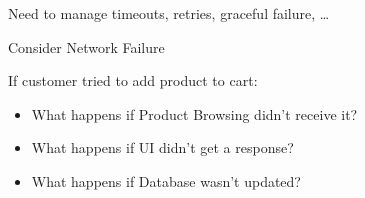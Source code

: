 \documentclass{slide}
\begin{document}
{Need to manage timeouts, retries, graceful failure, \dots}

\begin{frame}{Consider Network Failure}
    \vspace{1mm}
    {\LARGE
    If customer tried to add product to cart:
    \begin{itemize}
        \item What happens if Product Browsing didn't receive it?
        \item What happens if UI didn't get a response?
        \item What happens if Database wasn't updated?
    \end{itemize}
    }
\end{frame}

%
%
\end{document}
